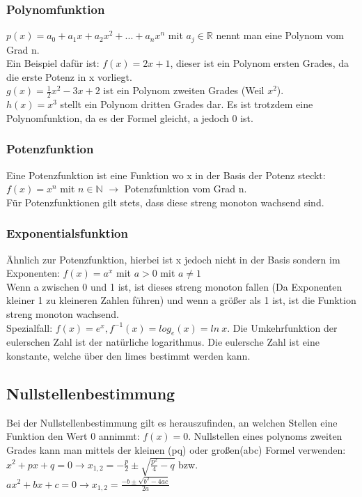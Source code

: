 \documentclass{article}
\newcommand{\N}{\mathbb{N}}
\newcommand{\R}{\mathbb{R}}
\begin{document}
	\subsubsection{Polynomfunktion}
	$p(x)=a_0+a_1x+a_2x^2+...+a_nx^n$ mit $a_j \in \R$ nennt man eine Polynom vom Grad n.\\
	Ein Beispiel dafür ist: $f(x)=2x+1$, dieser ist ein Polynom ersten Grades, da die erste Potenz in x vorliegt. \\
	$g(x)=\frac{1}{2}x^2-3x+2$ ist ein Polynom zweiten Grades (Weil $x^2$). \\
	$h(x)=x^3$ stellt ein Polynom dritten Grades dar. Es ist trotzdem eine Polynomfunktion, da es der Formel gleicht, a jedoch 0 ist. \subsubsection{Potenzfunktion}
	Eine Potenzfunktion ist eine Funktion wo x in der Basis der Potenz steckt: $f(x)=x^n$ mit $n\in \N$ $\to$ Potenzfunktion vom Grad n. \\
	Für Potenzfunktionen gilt stets, dass diese streng monoton wachsend sind. 
	\subsubsection{Exponentialsfunktion}
	Ähnlich zur Potenzfunktion, hierbei ist x jedoch nicht in der Basis sondern im Exponenten: $f(x)=a^x$ mit $a>0$ mit $a\ne 1$ \\
	Wenn a zwischen 0 und 1 ist, ist dieses streng monoton fallen (Da Exponenten kleiner 1 zu kleineren Zahlen führen) und wenn a größer als 1 ist, ist die Funktion streng monoton wachsend. \\
	Spezialfall: $f(x)=e^x, f^{-1}(x)=log_e(x) = ln\ x$. Die Umkehrfunktion der eulerschen Zahl ist der natürliche logarithmus. Die eulersche Zahl ist eine konstante, welche über den limes bestimmt werden kann.
	\subsection{Nullstellenbestimmung}
	Bei der Nullstellenbestimmung gilt es herauszufinden, an welchen Stellen eine Funktion den Wert 0 annimmt: $f(x)=0$. Nullstellen eines polynoms zweiten Grades kann man mittels der kleinen (pq) oder großen(abc) Formel verwenden: $x^2+px+q=0 \to x_{1,2}=-\frac{p}{2} \pm \sqrt{\frac{p^2}{4}-q}$ bzw. $ax^2+bx+c=0 \to x_{1,2}=\frac{-b \pm \sqrt{b^2 -4ac}}{2a}$
\end{document}
